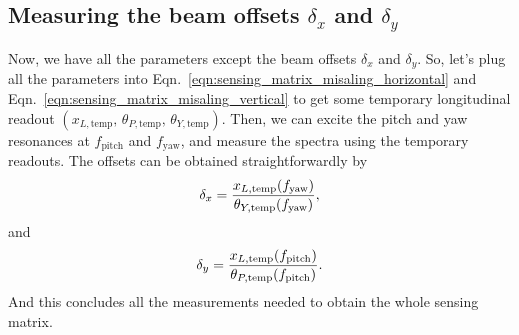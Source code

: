 \subsection{Measuring the beam offsets $\delta_x$ and $\delta_y$}
Now, we have all the parameters except the beam offsets $\delta_x$ and $\delta_y$.
So, let's plug all the parameters into Eqn.~\eqref{eqn:sensing_matrix_misaling_horizontal} and Eqn.~\eqref{eqn:sensing_matrix_misaling_vertical} to get some temporary longitudinal readout $\left(x_{L,\mathrm{temp}},\, \theta_{P,\mathrm{temp}},\, \theta_{Y,\mathrm{temp}}\right)$.
Then, we can excite the pitch and yaw resonances at $f_\mathrm{pitch}$ and $f_\mathrm{yaw}$, and measure the spectra using the temporary readouts.
The offsets can be obtained straightforwardly by
\begin{equation}
	\delta_x = \frac{x_{L,\mathrm{temp}}\mleft(f_\mathrm{yaw}\mright)}{\theta_{Y,\mathrm{temp}}\mleft(f_\mathrm{yaw}\mright)},
\end{equation}
and
\begin{equation}
	\delta_y = \frac{x_{L,\mathrm{temp}}\mleft(f_\mathrm{pitch}\mright)}{\theta_{P,\mathrm{temp}}\mleft(f_\mathrm{pitch}\mright)}.
\end{equation}
And this concludes all the measurements needed to obtain the whole sensing matrix.
